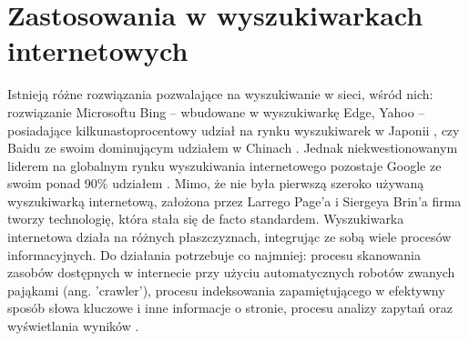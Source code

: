 \section{Zastosowania w wyszukiwarkach internetowych}

Istnieją różne rozwiązania pozwalające na wyszukiwanie w sieci, wśród nich: rozwiązanie
Microsoftu Bing – wbudowane w wyszukiwarkę Edge, Yahoo – posiadające kilkunastoprocentowy
udział na rynku wyszukiwarek w Japonii \autocite{searchsharejapan}, czy Baidu ze swoim dominującym udziałem w Chinach \autocite{searchsharechina}.
Jednak niekwestionowanym liderem na globalnym rynku wyszukiwania internetowego pozostaje
Google ze swoim ponad 90\% udziałem \autocite{searchshare}. Mimo, że nie była pierwszą szeroko używaną wyszukiwarką
internetową, założona przez Larrego Page'a i Siergeya Brin'a firma tworzy technologię, która stała się
de facto standardem.
Wyszukiwarka internetowa działa na różnych płaszczyznach, integrując ze sobą wiele
procesów informacyjnych. Do działania potrzebuje co najmniej: procesu skanowania zasobów
dostępnych w internecie przy użyciu automatycznych robotów zwanych pająkami (ang. 'crawler'),
procesu indeksowania zapamiętującego w efektywny sposób słowa kluczowe i inne informacje o
stronie, procesu analizy zapytań oraz wyświetlania wyników \autocite{howgoogleworks}. \newline

